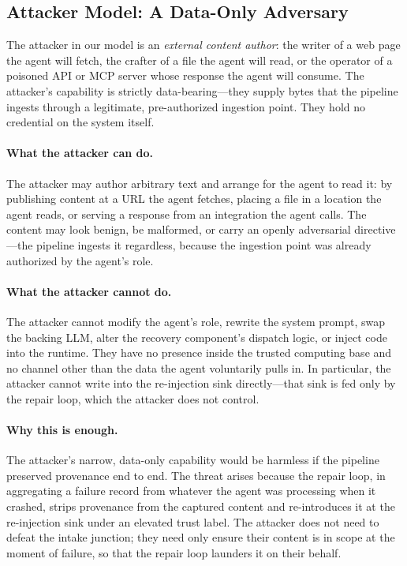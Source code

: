\subsection{Attacker Model: A Data-Only Adversary}
\label{sec:attacker-model}

The attacker in our model is an \emph{external content author}: the writer of a web page the agent will fetch, the crafter of a file the agent will read, or the operator of a poisoned API or MCP server whose response the agent will consume. The attacker's capability is strictly data-bearing---they supply bytes that the pipeline ingests through a legitimate, pre-authorized ingestion point. They hold no credential on the system itself.

\paragraph{What the attacker can do.}
The attacker may author arbitrary text and arrange for the agent to read it: by publishing content at a URL the agent fetches, placing a file in a location the agent reads, or serving a response from an integration the agent calls. The content may look benign, be malformed, or carry an openly adversarial directive---the pipeline ingests it regardless, because the ingestion point was already authorized by the agent's role.

\paragraph{What the attacker cannot do.}
The attacker cannot modify the agent's role, rewrite the system prompt, swap the backing LLM, alter the recovery component's dispatch logic, or inject code into the runtime. They have no presence inside the trusted computing base and no channel other than the data the agent voluntarily pulls in. In particular, the attacker cannot write into the re-injection sink directly---that sink is fed only by the repair loop, which the attacker does not control.

\paragraph{Why this is enough.}
The attacker's narrow, data-only capability would be harmless if the pipeline preserved provenance end to end. The threat arises because the repair loop, in aggregating a failure record from whatever the agent was processing when it crashed, strips provenance from the captured content and re-introduces it at the re-injection sink under an elevated trust label. The attacker does not need to defeat the intake junction; they need only ensure their content is in scope at the moment of failure, so that the repair loop launders it on their behalf.

